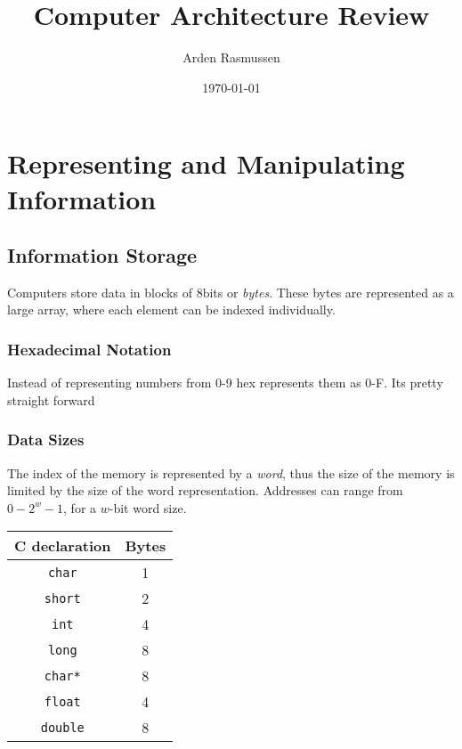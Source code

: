 \documentclass[10pt]{armath}
\title{Computer Architecture Review}
\author{Arden Rasmussen}
\date{\today}
\newcommand{\s}[1]{\texttt{#1}}
\begin{document}
\maketitle

\section{Representing and Manipulating Information}%
\label{sec:representing_and_manipulating_information}

\subsection{Information Storage}%
\label{sub:information_storage}

Computers store data in blocks of 8bits or \textit{bytes}. These bytes are
represented as a large array, where each element can be indexed individually.

\subsubsection{Hexadecimal Notation}%
\label{ssub:hexadecimal_notation}

Instead of representing numbers from 0-9 hex represents them as 0-F. Its
pretty straight forward

\subsubsection{Data Sizes}%
\label{ssub:data_sizes}

The index of the memory is represented by a \textit{word}, thus the size of the
memory is limited by the size of the word representation. Addresses can range
from $0-2^w-1$, for a $w$-bit word size.

\begin{center}
  \begin{tabular}{c c}
    C declaration & Bytes \\
    \hline
    \s{char} & 1\\
    \s{short} & 2 \\
    \s{int} & 4 \\
    \s{long} & 8 \\
    \s{char*} & 8 \\
    \s{float} & 4 \\
    \s{double} & 8\\
    \hline
  \end{tabular}
\end{center}
\end{document}
